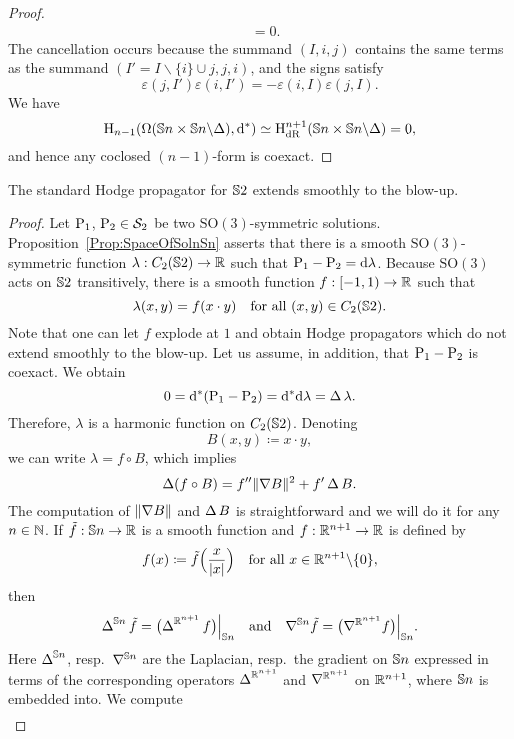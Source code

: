 \documentclass[\MainFolder/Text.tex]{subfiles}
\newcommand{\Soln}{\mathcal{S}}
\newcommand{\SO}{\mathrm{SO}}
\begin{document}
\begin{proof}
\begin{align*}
& = 0.
\end{align*}
The cancellation occurs because the summand $(I, i, j)$ contains the same terms as the summand $(I'=I\backslash\{i\}\cup j, j, i)$, and the signs satisfy
$$ \varepsilon(j,I')\varepsilon(i,I') = - \varepsilon(i,I)\varepsilon(j,I). $$
We have
$$ \mathrm{H}_{n-1}(\Omega(\mathbb{S}{n}\times\mathbb{S}{n}\backslash\Delta),\mathrm{d}^*) \simeq \mathrm{H}_{\mathrm{dR}}^{n+1}(\mathbb{S}{n}\times\mathbb{S}{n}\backslash\Delta) = 0, $$
and hence any coclosed $(n-1)$-form is coexact.
\end{proof}

\begin{Proposition}\label{Prop:StdS2}
The standard Hodge propagator for $\mathbb{S}{2}$ extends smoothly to the blow-up.
\end{Proposition}
\begin{proof}
Let $\mathrm{P}_1$, $\Prpg_2 \in \Soln_2$ be two $\SO(3)$-symmetric solutions. Proposition~\ref{Prop:SpaceOfSolnSn} asserts that there is a smooth $\SO(3)$-symmetric function $\lambda: C_2(\mathbb{S}{2})\rightarrow \mathbb{R}$ such that $\mathrm{P}_1 - \mathrm{P}_2 = \mathrm{d} \lambda$. Because $\SO(3)$ acts on $\mathbb{S}{2}$ transitively, there is a smooth function $f: [-1,1)\rightarrow \mathbb{R}$ such that
$$ \lambda(x,y) = f(x\cdot y)\quad\text{for all }(x,y)\in C_2(\mathbb{S}{2}). $$
Note that one can let $f$ explode at $1$ and obtain Hodge propagators which do not extend smoothly to the blow-up. Let us assume, in addition, that $\mathrm{P}_1 - \mathrm{P}_2$ is coexact. We obtain 
$$ 0 = \mathrm{d}^*(\mathrm{P}_1 - \mathrm{P}_2) = \mathrm{d}^* \mathrm{d}\lambda = \operatorname{\Delta} \lambda. $$
Therefore, $\lambda$ is a harmonic function on $C_2(\mathbb{S}{2})$. Denoting 
\[
B(x,y) \coloneqq x\cdot y,
\]
we can write $\lambda = f\circ B$,  which implies
$$ \operatorname{\Delta}(f \circ B) = f'' \| \nabla B \|^2 + f' \operatorname{\Delta} B. $$
The computation of $\| \nabla B \|$ and $\operatorname{\Delta} B$ is straightforward and we will do it for any $n\in \mathbb{N}$. If $\tilde{f}: \mathbb{S}{n} \rightarrow \mathbb{R}$ is a smooth function and $f: \mathbb{R}^{n+1} \rightarrow \mathbb{R}$ is defined by 
$$ f(x)\coloneqq \tilde{f}\Bigl(\frac{x}{|x|}\Bigr)\quad\text{for all }x\in \mathbb{R}^{n+1}\backslash\{0\}, $$
then
$$ \Laplace^{\Sph{n}} \tilde{f} = \Restr{\bigl(\Laplace^{\R^{n+1}}f\bigr)}{\Sph{n}}\quad\text{and}\quad \Grad^{\Sph{n}} \tilde{f} = \Restr{\bigl(\Grad^{\R^{n+1}}f\bigr)}{\Sph{n}}. $$
Here $\operatorname{\Delta}^{\mathbb{S}{n}}$, resp.~$\nabla^{\mathbb{S}{n}}$ are the Laplacian, resp.~the gradient on $\mathbb{S}{n}$ expressed in terms of the corresponding operators $\operatorname{\Delta}^{\mathbb{R}^{n+1}}$ and $\nabla^{\mathbb{R}^{n+1}}$ on $\mathbb{R}^{n+1}$, where $\mathbb{S}{n}$ is embedded into. 
We compute
\begin{align*}

\end{align*}
\end{proof}
\end{document}
